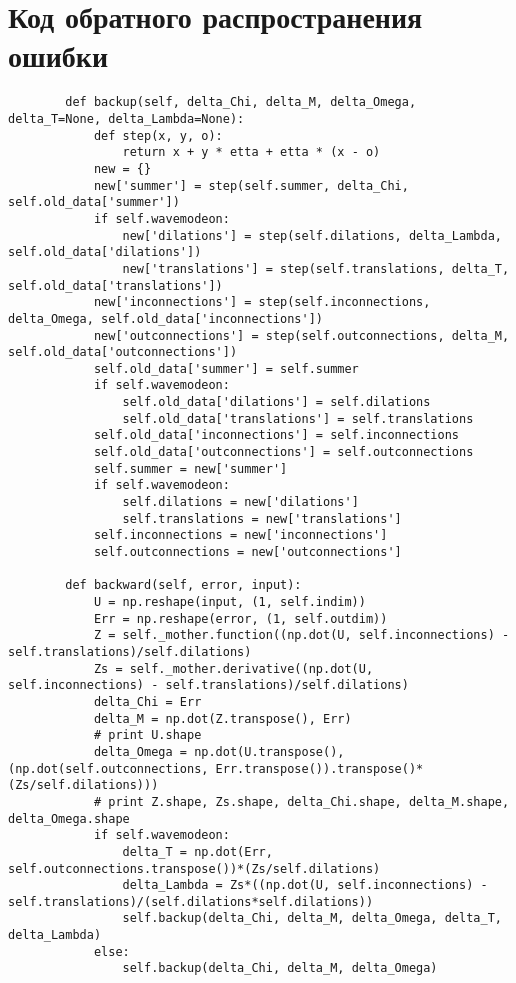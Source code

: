 \documentclass[utf8,usehyperref,14pt]{G7-32}
\begin{document}
\newpage
\appendix
\chapter{Код обратного распространения ошибки}
\label{backprop}
\begin{lstlisting}
        def backup(self, delta_Chi, delta_M, delta_Omega, delta_T=None, delta_Lambda=None):
            def step(x, y, o):
                return x + y * etta + etta * (x - o)
            new = {}
            new['summer'] = step(self.summer, delta_Chi, self.old_data['summer'])
            if self.wavemodeon:
                new['dilations'] = step(self.dilations, delta_Lambda, self.old_data['dilations'])
                new['translations'] = step(self.translations, delta_T, self.old_data['translations'])
            new['inconnections'] = step(self.inconnections, delta_Omega, self.old_data['inconnections'])
            new['outconnections'] = step(self.outconnections, delta_M, self.old_data['outconnections'])
            self.old_data['summer'] = self.summer
            if self.wavemodeon:
                self.old_data['dilations'] = self.dilations
                self.old_data['translations'] = self.translations
            self.old_data['inconnections'] = self.inconnections
            self.old_data['outconnections'] = self.outconnections
            self.summer = new['summer']
            if self.wavemodeon:
                self.dilations = new['dilations']
                self.translations = new['translations']
            self.inconnections = new['inconnections']
            self.outconnections = new['outconnections']

        def backward(self, error, input):
            U = np.reshape(input, (1, self.indim))
            Err = np.reshape(error, (1, self.outdim))
            Z = self._mother.function((np.dot(U, self.inconnections) - self.translations)/self.dilations)
            Zs = self._mother.derivative((np.dot(U, self.inconnections) - self.translations)/self.dilations)
            delta_Chi = Err
            delta_M = np.dot(Z.transpose(), Err)
            # print U.shape
            delta_Omega = np.dot(U.transpose(), (np.dot(self.outconnections, Err.transpose()).transpose()*(Zs/self.dilations)))
            # print Z.shape, Zs.shape, delta_Chi.shape, delta_M.shape, delta_Omega.shape
            if self.wavemodeon:
                delta_T = np.dot(Err, self.outconnections.transpose())*(Zs/self.dilations)
                delta_Lambda = Zs*((np.dot(U, self.inconnections) - self.translations)/(self.dilations*self.dilations))
                self.backup(delta_Chi, delta_M, delta_Omega, delta_T, delta_Lambda)
            else:
                self.backup(delta_Chi, delta_M, delta_Omega)
\end{lstlisting}

\end{document}
